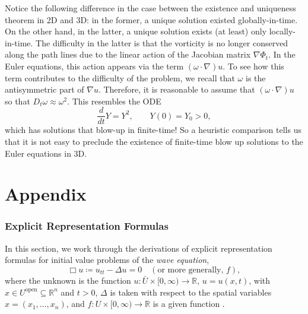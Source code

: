 \documentclass{article}
\begin{document}
Notice the following difference in the case between the existence and uniqueness theorem in 2D and 3D: in the former, a unique solution existed globally-in-time. On the other hand, in the latter, a unique solution exists (at least) only locally-in-time. The difficulty in the latter is that the vorticity is no longer conserved along the path lines due to the linear action of the Jacobian matrix $\nabla \Phi_{t}$. In the Euler equations, this action appears via the term $(\omega \cdot \nabla)u$. To see how this term contributes to the difficulty of the problem, we recall that $\omega$ is the antisymmetric part of $\nabla u$. Therefore, it is reasonable to assume that $(\omega \cdot \nabla) u$ so that $D_{t}\omega \approx \omega^{2}$. This resembles the ODE 
\begin{equation*}
	\frac{d}{dt}Y = Y^{2}, \qquad Y(0) = Y_{0} > 0, 
\end{equation*}
which has solutions that blow-up in finite-time! So a heuristic comparison tells us that it is not easy to preclude the existence of finite-time blow up solutions to the Euler equations in 3D. 
\newpage 

\newpage 
\part{Appendix} 
\appendix
\section{Explicit Representation Formulas} 
\label{sec:A.Representation}
In this section, we work through the derivations of explicit representation formulas for initial value problems of the \textit{wave equation},
\begin{equation}
	\Box u\coloneqq u_{tt} - \Delta u = 0 \quad (\text{or more generally, } f), 
\end{equation}
where the unknown is the function $u: \bar{U} \times [0, \infty) \to \mathbb{R}$, $u = u(x, t)$, with $x \in U^{\text{open}} \subseteq \mathbb{R}^{n}$ and $t > 0$, $\Delta$ is taken with respect to the spatial variables $x = (x_{1}, \ldots, x_{n})$, and $f: U \times [0, \infty) \to \mathbb{R}$ is a given function \cite{evans10}. 
\end{document}

